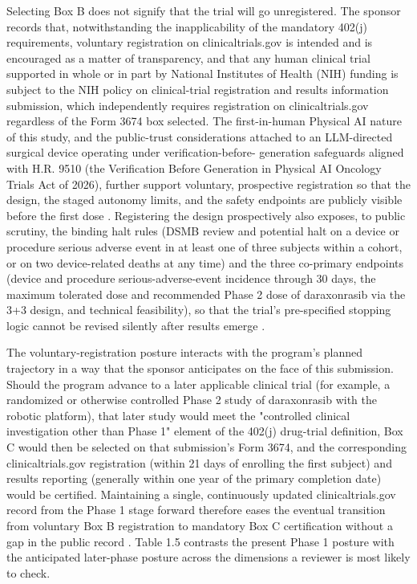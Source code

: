Selecting Box B does not signify that the trial will go unregistered.
The sponsor records that, notwithstanding the inapplicability of the
mandatory 402(j) requirements, voluntary registration on
clinicaltrials.gov is intended and is encouraged as a matter of
transparency, and that any human clinical trial supported in whole or in
part by National Institutes of Health (NIH) funding is subject to the NIH
policy on clinical-trial registration and results information submission,
which independently requires registration on clinicaltrials.gov
regardless of the Form 3674 box selected. The first-in-human Physical AI
nature of this study, and the public-trust considerations attached to an
LLM-directed surgical device operating under verification-before-
generation safeguards aligned with H.R. 9510 (the Verification Before
Generation in Physical AI Oncology Trials Act of 2026), further support
voluntary, prospective registration so that the design, the staged
autonomy limits, and the safety endpoints are publicly visible before the
first dose \cite{congress9510, clintrustpai, paipredict4x}. Registering
the design prospectively also exposes, to public scrutiny, the binding
halt rules (DSMB review and potential halt on a device or procedure
serious adverse event in at least one of three subjects within a cohort,
or on two device-related deaths at any time) and the three co-primary
endpoints (device and procedure serious-adverse-event incidence through 30
days, the maximum tolerated dose and recommended Phase 2 dose of
daraxonrasib via the 3+3 design, and technical feasibility), so that the
trial's pre-specified stopping logic cannot be revised silently after
results emerge \cite{paiautospons, oncotrialllm}.

The voluntary-registration posture interacts with the program's planned
trajectory in a way that the sponsor anticipates on the face of this
submission. Should the program advance to a later applicable clinical
trial (for example, a randomized or otherwise controlled Phase 2 study of
daraxonrasib with the robotic platform), that later study would meet the
"controlled clinical investigation other than Phase 1" element of the
402(j) drug-trial definition, Box C would then be selected on that
submission's Form 3674, and the corresponding clinicaltrials.gov
registration (within 21 days of enrolling the first subject) and results
reporting (generally within one year of the primary completion date) would
be certified. Maintaining a single, continuously updated
clinicaltrials.gov record from the Phase 1 stage forward therefore eases
the eventual transition from voluntary Box B registration to mandatory Box
C certification without a gap in the public record \cite{phase1guidance,
paisitedocpk}. Table 1.5 contrasts the present Phase 1 posture with the
anticipated later-phase posture across the dimensions a reviewer is most
likely to check.

